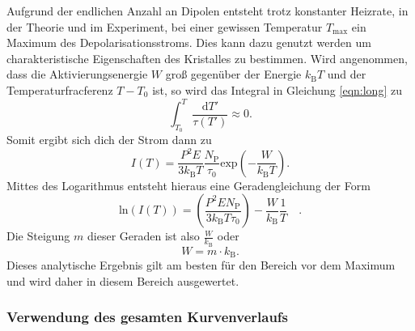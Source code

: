         Aufgrund der endlichen Anzahl an Dipolen entsteht trotz konstanter Heizrate, in der Theorie und im Experiment, bei einer gewissen Temperatur $T_\text{max}$ ein Maximum des Depolarisationsstroms.
        Dies kann dazu genutzt werden um charakteristische Eigenschaften des Kristalles zu bestimmen.
        Wird angenommen, dass die Aktivierungsenergie $W$ groß gegenüber der Energie $k_\text{B}T$ und der Temperaturfracferenz $T-T_0$ ist, so wird das Integral in Gleichung \ref{eqn:long} zu
        \begin{equation}
            \int_{T_0}^T\frac{\text{d}T'}{\tau(T')} \approx 0.
        \end{equation}
        Somit ergibt sich dich der Strom dann zu
        \begin{equation}
            I(T) = \frac{P^2E}{3k_\text{B}T}\frac{N_\text{P}}{\tau_0} \text{exp}\left(-\frac{W}{k_\text{B}T}\right).
        \end{equation}	
        Mittes des Logarithmus entsteht hieraus eine Geradengleichung der Form
        \begin{equation}
            \text{ln}(I(T)) = \left(\frac{P^2EN_\text{P}}{3k_\text{B}T\tau_0}\right) - \frac{W}{k_\text{B}} \frac{1}{T} \quad .
        \end{equation}
        Die Steigung $m$ dieser Geraden ist also $\frac{W}{k_\text{B}}$ oder
        \begin{equation}
            W = m \cdot k_\text{B}.
            \label{eqn:W}
        \end{equation}
        Dieses analytische Ergebnis gilt am besten für den Bereich vor dem Maximum und wird daher in diesem Bereich ausgewertet.			

\subsubsection{Verwendung des gesamten Kurvenverlaufs}


